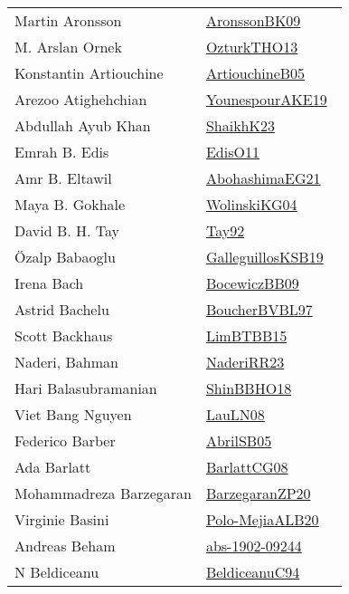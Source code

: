 {\begin{longtable}{p{4cm}p{20cm}}
Martin Aronsson & \href{works/AronssonBK09.pdf}{AronssonBK09}~\cite{AronssonBK09}\\
M. Arslan Ornek & \href{works/OzturkTHO13.pdf}{OzturkTHO13}~\cite{OzturkTHO13}\\
Konstantin Artiouchine & \href{works/ArtiouchineB05.pdf}{ArtiouchineB05}~\cite{ArtiouchineB05}\\
Arezoo Atighehchian & \href{works/YounespourAKE19.pdf}{YounespourAKE19}~\cite{YounespourAKE19}\\
Abdullah Ayub Khan & \href{works/ShaikhK23.pdf}{ShaikhK23}~\cite{ShaikhK23}\\
Emrah B. Edis & \href{works/EdisO11.pdf}{EdisO11}~\cite{EdisO11}\\
Amr B. Eltawil & \href{works/AbohashimaEG21.pdf}{AbohashimaEG21}~\cite{AbohashimaEG21}\\
Maya B. Gokhale & \href{works/WolinskiKG04.pdf}{WolinskiKG04}~\cite{WolinskiKG04}\\
David B. H. Tay & \href{}{Tay92}~\cite{Tay92}\\
{\"{O}}zalp Babaoglu & \href{works/GalleguillosKSB19.pdf}{GalleguillosKSB19}~\cite{GalleguillosKSB19}\\
Irena Bach & \href{works/BocewiczBB09.pdf}{BocewiczBB09}~\cite{BocewiczBB09}\\
Astrid Bachelu & \href{}{BoucherBVBL97}~\cite{BoucherBVBL97}\\
Scott Backhaus & \href{works/LimBTBB15.pdf}{LimBTBB15}~\cite{LimBTBB15}\\
Naderi, Bahman & \href{works/NaderiRR23.pdf}{NaderiRR23}~\cite{NaderiRR23}\\
Hari Balasubramanian & \href{works/ShinBBHO18.pdf}{ShinBBHO18}~\cite{ShinBBHO18}\\
Viet Bang Nguyen & \href{works/LauLN08.pdf}{LauLN08}~\cite{LauLN08}\\
Federico Barber & \href{works/AbrilSB05.pdf}{AbrilSB05}~\cite{AbrilSB05}\\
Ada Barlatt & \href{works/BarlattCG08.pdf}{BarlattCG08}~\cite{BarlattCG08}\\
Mohammadreza Barzegaran & \href{works/BarzegaranZP20.pdf}{BarzegaranZP20}~\cite{BarzegaranZP20}\\
Virginie Basini & \href{works/Polo-MejiaALB20.pdf}{Polo-MejiaALB20}~\cite{Polo-MejiaALB20}\\
Andreas Beham & \href{works/abs-1902-09244.pdf}{abs-1902-09244}~\cite{abs-1902-09244}\\
N Beldiceanu & \href{works/BeldiceanuC94.pdf}{BeldiceanuC94}~\cite{BeldiceanuC94}\\

\end{longtable}}
